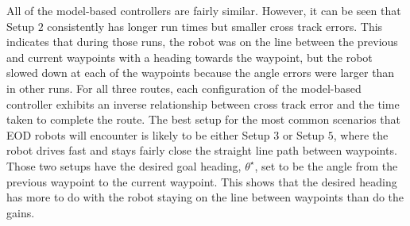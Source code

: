 All of the model-based controllers are fairly similar. However, it can be seen that Setup $2$ consistently has longer run times but smaller cross track errors. This indicates that during those runs, the robot was on the line between the previous and current waypoints with a heading towards the waypoint, but the robot slowed down at each of the waypoints because the angle errors were larger than in other runs. For all three routes, each configuration of the model-based controller exhibits an inverse relationship between cross track error and the time taken to complete the route. The best setup for the most common scenarios that EOD robots will encounter is likely to be either Setup $3$ or Setup $5$, where the robot drives fast and stays fairly close the straight line path between waypoints. Those two setups have the desired goal heading, $\theta^\star$, set to be the angle from the previous waypoint to the current waypoint. This shows that the desired heading has more to do with the robot staying on the line between waypoints than do the gains.
